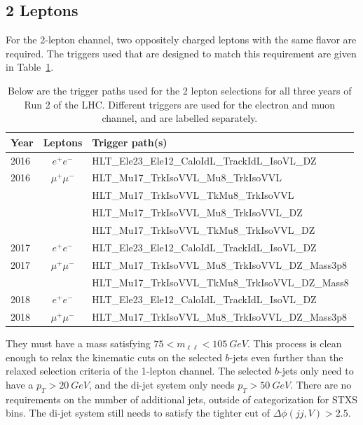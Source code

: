 \subsection{2 Leptons} \label{sec:resolved-2}

For the 2-lepton channel, two oppositely charged leptons with the same flavor are required.
The triggers used that are designed to match this requirement are given
in Table~\ref{tab:2-triggers}.
\begin{table}
  \centering
  \caption[Triggers for the 2 lepton selections]{
    Below are the trigger paths used for the 2 lepton selections
    for all three years of Run 2 of the LHC.
    Different triggers are used for the electron and muon channel,
    and are labelled separately.
  }
  \begin{tabular}{|l|c|l|}
    \hline
    Year & Leptons & Trigger path(s) \\
    \hline
    2016 & $e^+e^-$ & HLT\_Ele23\_Ele12\_CaloIdL\_TrackIdL\_IsoVL\_DZ \\
    \hline
    2016 & $\mu^+\mu^-$ & HLT\_Mu17\_TrkIsoVVL\_Mu8\_TrkIsoVVL \\
    & & HLT\_Mu17\_TrkIsoVVL\_TkMu8\_TrkIsoVVL \\
    & & HLT\_Mu17\_TrkIsoVVL\_Mu8\_TrkIsoVVL\_DZ \\
    & & HLT\_Mu17\_TrkIsoVVL\_TkMu8\_TrkIsoVVL\_DZ \\
    \hline
    2017 & $e^+e^-$ & HLT\_Ele23\_Ele12\_CaloIdL\_TrackIdL\_IsoVL\_DZ \\
    \hline
    2017 & $\mu^+\mu^-$ & HLT\_Mu17\_TrkIsoVVL\_Mu8\_TrkIsoVVL\_DZ\_Mass3p8 \\
    & & HLT\_Mu17\_TrkIsoVVL\_TkMu8\_TrkIsoVVL\_DZ\_Mass8 \\
    \hline
    2018 & $e^+e^-$ & HLT\_Ele23\_Ele12\_CaloIdL\_TrackIdL\_IsoVL\_DZ \\
    \hline
    2018 & $\mu^+\mu^-$ & HLT\_Mu17\_TrkIsoVVL\_Mu8\_TrkIsoVVL\_DZ\_Mass3p8 \\
    \hline
  \end{tabular}
  \label{tab:2-triggers}
\end{table}
They must have a mass satisfying $75 < m_{\ell\ell} < \SI{105}{GeV}$.
This process is clean enough to relax the kinematic cuts on the selected $b$-jets
even further than the relaxed selection criteria of the 1-lepton channel.
The selected $b$-jets only need to have a $p_T > \SI{20}{GeV}$,
and the di-jet system only needs $p_T > \SI{50}{GeV}$.
There are no requirements on the number of additional jets, outside of categorization for STXS bins.
The di-jet system still needs to satisfy the tighter cut of $\Delta\phi(jj,V) > 2.5$.


